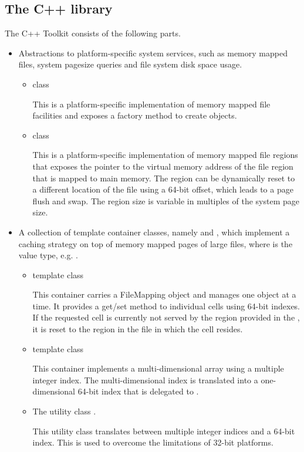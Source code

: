 \documentclass[12pt,a4paper]{article}
\begin{document}
\subsection{The C++ library}

The C++ Toolkit consists of the following parts.

\begin{itemize}
  \item Abstractions to platform-specific system services, such as memory mapped files, system pagesize queries and file system disk space usage.

  \begin{itemize}
    \item {} class

This is a platform-specific implementation of memory mapped file facilities and exposes a factory method to create  objects.

    \item {} class

This is a platform-specific implementation of memory mapped file regions that exposes the pointer to the virtual memory address of the file region that is mapped to main memory. 
The region can be dynamically reset to a different location of the file using a 64-bit offset, which leads to a page flush and swap.
The region size is variable in multiples of the system page size.

  \end{itemize}

\item A collection of template container classes, namely  and , which implement a caching strategy on top of memory mapped pages of large files, where  is the value type, e.g. . 

  \begin{itemize}
    \item {} template class

This container carries a FileMapping object and manages one  object at a time. 
It provides a get/set method to individual cells using 64-bit indexes. 
If the requested cell is currently not served by the region provided in the , it is reset to the region in the file in which the cell resides. 

    \item {} template class

This container implements a multi-dimensional array using a multiple integer index.
The multi-dimensional index is translated into a one-dimensional 64-bit index that is delegated to .


    \item The utility class . 

This utility class translates between multiple integer indices and a 64-bit index.
This is used to overcome the limitations of 32-bit \R{} platforms.

\end{itemize}
\end{itemize}
\end{document}
